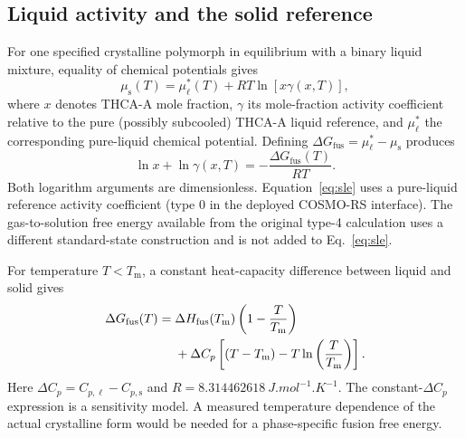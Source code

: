 \documentclass[10pt,a4paper,twocolumn]{article}
\begin{document}
\subsection{Liquid activity and the solid reference}
For one specified crystalline polymorph in equilibrium with a binary liquid mixture, equality of chemical potentials gives
\begin{equation}
\mu_{\mathrm{s}}(T)=\mu_{\ell}^{*}(T)+RT\ln\!\left[x\gamma(x,T)\right],
\label{eq:mu}
\end{equation}
where $x$ denotes THCA-A mole fraction, $\gamma$ its mole-fraction activity coefficient relative to the pure (possibly subcooled) THCA-A liquid reference, and $\mu_{\ell}^{*}$ the corresponding pure-liquid chemical potential. Defining $\Delta G_{\mathrm{fus}}=\mu_{\ell}^{*}-\mu_{\mathrm{s}}$ produces
\begin{equation}
\ln x+\ln\gamma(x,T)
=-\frac{\Delta G_{\mathrm{fus}}(T)}{RT}.
\label{eq:sle}
\end{equation}
Both logarithm arguments are dimensionless. Equation~\ref{eq:sle} uses a pure-liquid reference activity coefficient (type 0 in the deployed COSMO-RS interface). The gas-to-solution free energy available from the original type-4 calculation uses a different standard-state construction and is not added to Eq.~\ref{eq:sle}.

For temperature $T<T_{\mathrm m}$, a constant heat-capacity difference between liquid and solid gives
\begin{align}
\Delta G_{\mathrm{fus}}(T)
={}&\Delta H_{\mathrm{fus}}(T_{\mathrm m})
\left(1-\frac{T}{T_{\mathrm m}}\right)\notag\\
&+\Delta C_p\left[(T-T_{\mathrm m})
-T\ln\left(\frac{T}{T_{\mathrm m}}\right)\right].
\label{eq:fusion}
\end{align}
Here $\Delta C_p=C_{p,\ell}-C_{p,\mathrm s}$ and $R=\SI{8.314462618}{J.mol^{-1}.K^{-1}}$. The constant-$\Delta C_p$ expression is a sensitivity model. A measured temperature dependence of the actual crystalline form would be needed for a phase-specific fusion free energy.
\end{document}
